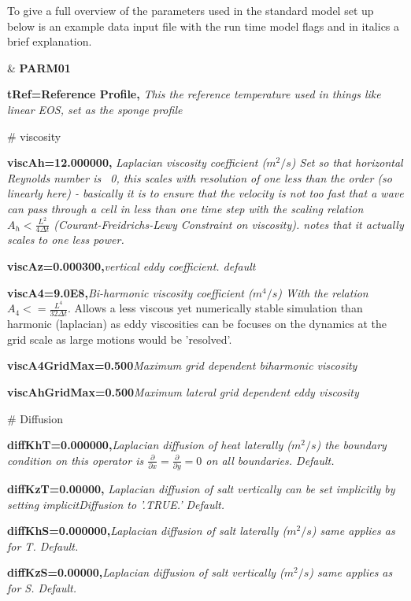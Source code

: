 

To give a full overview of the parameters used in the standard model set up below is an example data input file with the run time model flags and in italics a brief explanation. 

{\setlength{\parindent}{0cm}
\& \textbf{PARM01}

\textbf{tRef=Reference Profile,} \textit{This the reference temperature used in things like linear EOS, set as the sponge profile} 

\# viscosity 

\textbf{viscAh=12.000000,} \textit{Laplacian viscosity coefficient ($m^2/s$) Set so that horizontal Reynolds number is ~0, this scales with resolution of one less than the order (so linearly here) - basically it is to ensure that the velocity is not too fast that a wave can pass through a cell in less than one time step with the scaling relation  $\displaystyle A_h < \frac{L^2}{4 \Delta t}$ (Courant-Freidrichs-Lewy Constraint on viscosity). \citet{griffies2000} notes that it actually scales to one less power.}
 
\textbf{viscAz=0.000300,}\textit{vertical eddy coefficient. default}
 
\textbf{viscA4=9.0E8,}\textit{Bi-harmonic viscosity coefficient ($m^4/s$) With the relation $\displaystyle A_4 <= \frac{L^4}{32 \Delta t}$}. Allows a less viscous yet numerically stable simulation than harmonic (laplacian) as eddy viscosities can be focuses on the dynamics at the grid scale as large motions would be 'resolved'. 
 
 
\textbf{viscA4GridMax=0.500}\textit{Maximum grid dependent biharmonic viscosity }

 
\textbf{viscAhGridMax=0.500}\textit{Maximum lateral grid dependent eddy viscosity}
 
\# Diffusion 
 
\textbf{diffKhT=0.000000,}\textit{Laplacian diffusion of heat laterally ($m^2/s$) the boundary condition on this operator is $\displaystyle \frac{\partial}{\partial x}=\frac{\partial}{\partial y}=0$ on all boundaries. Default.}
 
\textbf{diffKzT=0.00000,} \textit{Laplacian diffusion of salt vertically can be set implicitly by setting implicitDiffusion to ’.TRUE.’ Default.}
 
\textbf{diffKhS=0.000000,}\textit{Laplacian diffusion of salt laterally ($m^2/s$) same applies as for T. Default. }
 
\textbf{diffKzS=0.00000,}\textit{Laplacian diffusion of salt vertically ($m^2/s$) same applies as for S.  Default.}

}
